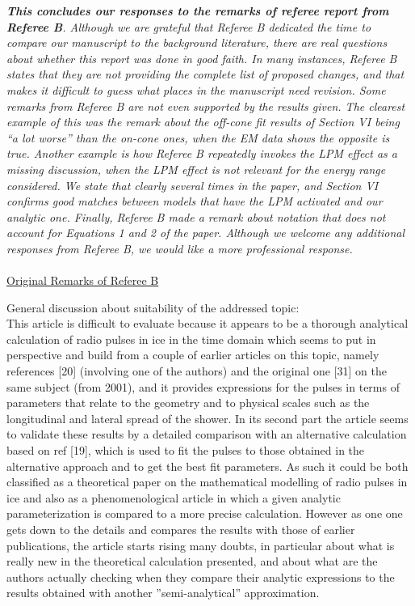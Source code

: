 \documentclass[12pt]{article}
\begin{document}
\textit{\textbf{This concludes our responses to the remarks of referee report from Referee B}.  Although we are grateful that Referee B dedicated the time to compare our manuscript to the background literature, there are real questions about whether this report was done in good faith.  In many instances, Referee B states that they are not providing the complete list of proposed changes, and that makes it difficult to guess what places in the manuscript need revision.  Some remarks from Referee B are not even supported by the results given.  The clearest example of this was the remark about the off-cone fit results of Section VI being ``a lot worse'' than the on-cone ones, when the EM data shows the opposite is true.  Another example is how Referee B repeatedly invokes the LPM effect as a missing discussion, when the LPM effect is not relevant for the energy range considered.  We state that clearly several times in the paper, and Section VI confirms good matches between models that have the LPM activated and our analytic one.  Finally, Referee B made a remark about notation that does not account for Equations 1 and 2 of the paper.  Although we welcome any additional responses from Referee B, we would like a more professional response.} \\ \\

\underline{Original Remarks of Referee B}

General discussion about suitability of the addressed topic: \\ 

This article is difficult to evaluate because it appears to be a thorough analytical calculation of radio pulses in ice in the time domain which seems to put in perspective and build from a couple of earlier articles on this topic, namely references [20] (involving one of the authors) and the original one [31] on the same subject (from 2001), and it provides expressions for the pulses in terms of parameters that relate to the geometry and to physical scales such as the longitudinal and lateral spread of the shower. In its second part the article seems to validate these results by a detailed comparison with an alternative calculation based on ref [19], which is used to fit the pulses to those obtained in the alternative approach and to get the best fit parameters. As such it could be both classified as a theoretical paper on the mathematical modelling of radio pulses in ice and also as a phenomenological article in which a given analytic parameterization is compared to a more precise calculation. However as one one gets down to the details and compares the results with those of earlier publications, the article starts rising many doubts, in particular about what is really new in the theoretical calculation presented, and about what are the authors actually checking when they compare their analytic expressions to the results obtained with another ''semi-analytical'' approximation.
\end{document}
